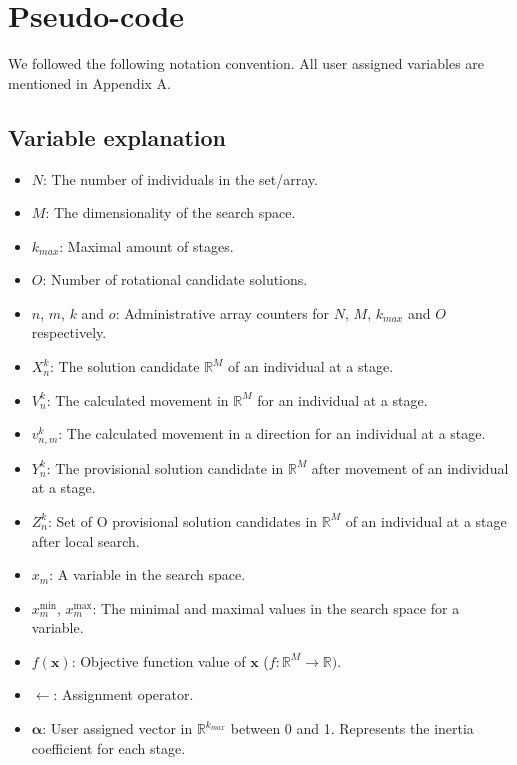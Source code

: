 \documentclass[runningheads]{llncs}
\begin{document}

\section{Pseudo-code}
\label{secPseu}
We followed the following notation convention. All user assigned variables are mentioned in Appendix A.
\subsection{Variable explanation}
\begin{itemize}
    \item $N$: The number of individuals in the set/array.
    \item $M$: The dimensionality of the search space.
    \item $k_{max}$: Maximal amount of stages.
    \item $O$: Number of rotational candidate solutions.
    \item $n$, $m$, $k$ and $o$: Administrative array counters for $N$, $M$, $k_{max}$ and $O$ respectively.
    \item $X_n^k$: The solution candidate $\mathds{R}^M$ of an individual at a stage.
    \item $V_n^k$: The calculated movement in $\mathds{R}^M$ for an individual at a stage.
    \item $v_{n,m}^k$: The calculated movement in a direction for an individual at a stage.
    \item $Y_n^k$: The provisional solution candidate in $\mathds{R}^M$ after movement of an individual at a stage.
    \item $Z_n^{k}$: Set of O provisional solution candidates in $\mathds{R}^M$ of an individual at a stage after local search.
    \item $x_m$: A variable in the search space.
    \item $x_m^{\text{min}}$, $x_m^{\text{max}}$: The minimal and maximal values in the search space for a variable.
    \item $f(\mathbf{x})$: Objective function value of $\mathbf{x}$ ($f: \mathds{R}^M \rightarrow \mathds{R})$.
    \item $\leftarrow$: Assignment operator.
    \item $\boldsymbol{\alpha}$: User assigned vector in $\mathds{R}^{k_{max}}$ between 0 and 1. Represents the inertia coefficient for each stage.

\end{itemize}
\end{document}
